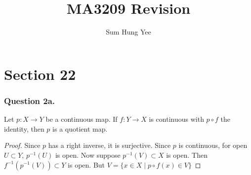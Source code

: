 \documentclass[12pt]{article}
\begin{document}
 

\title{MA3209 Revision} %
\author{Sum Hung Yee} %
\maketitle
\section{Section 22}
\subsubsection*{Question 2a.} Let $p: X \rightarrow Y$ be a continuous map. If $f: Y \rightarrow X$ is continuous
with $p \circ f$ the identity, then $p$ is a quotient map.
\begin{proof}
    Since $p$ has a right inverse, it is surjective. Since $p$ is continuous,
    for open $U \subset Y$, $p^{-1}(U)$ is open. Now suppose $p^{-1}(V) \subset X$ is open.
    Then $f^{-1}(p^{-1}(V)) \subset Y$ is open. 
    But $V = \{x\in X \mid p \circ f(x) \in V\}$
\end{proof}

    
\end{document}
